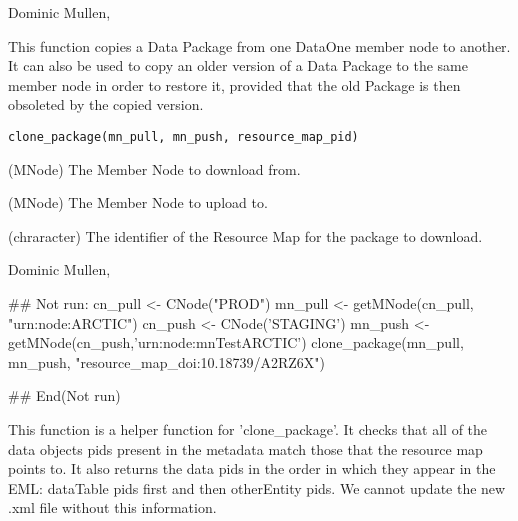 \documentclass[letterpaper]{book}
\begin{document}
%
\begin{Author}\relax
Dominic Mullen, 
\end{Author}
%
\begin{Description}\relax
This function copies a Data Package from one DataOne member node to another.
It can also be used to copy an older version of a Data Package to the same
member node in order to restore it, provided that the old Package is then
obsoleted by the copied version.
\end{Description}
%
\begin{Usage}
\begin{verbatim}
clone_package(mn_pull, mn_push, resource_map_pid)
\end{verbatim}
\end{Usage}
%
\begin{Arguments}
\begin{ldescription}
\item[\code{mn\_pull}] (MNode) The Member Node to download from.

\item[\code{mn\_push}] (MNode) The Member Node to upload to.

\item[\code{resource\_map\_pid}] (chraracter) The identifier of the Resource Map for the package to download.
\end{ldescription}
\end{Arguments}
%
\begin{Author}\relax
Dominic Mullen, 
\end{Author}
%
\begin{Examples}
\begin{ExampleCode}
## Not run: 
cn_pull <- CNode("PROD")
mn_pull <- getMNode(cn_pull, "urn:node:ARCTIC")
cn_push <- CNode('STAGING')
mn_push <- getMNode(cn_push,'urn:node:mnTestARCTIC')
clone_package(mn_pull, mn_push, "resource_map_doi:10.18739/A2RZ6X")

## End(Not run)

\end{ExampleCode}
\end{Examples}
%
\begin{Description}\relax
This function is a helper function for 'clone\_package'.  It checks that all
of the data objects pids present in the metadata match those that the
resource map points to.  It also returns the data pids in the order in which
they appear in the EML: dataTable pids first and then otherEntity pids.  We
cannot update the new .xml file without this information.
\end{Description}
\end{document}
